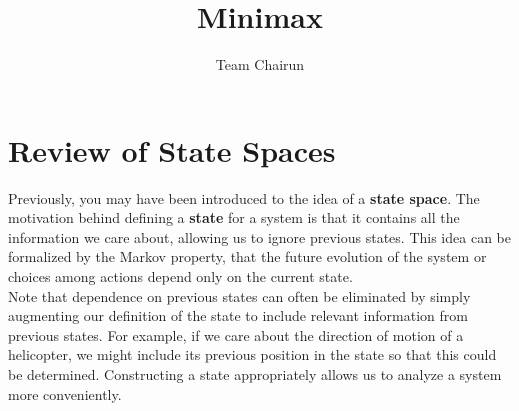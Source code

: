 \documentclass[12pt, letterpaper]{article}
\title{Minimax}
\author{Team Chairun}
\date{}
\begin{document}
\maketitle

\section*{Review of State Spaces}
Previously, you may have been introduced to the idea of a \textbf{state space}. The motivation behind defining a \textbf{state} for a system is that it contains all the information we care about, allowing us to ignore previous states. This idea can be formalized by the Markov property, that the future evolution of the system or choices among actions depend only on the current state. \\[0.2cm]
Note that dependence on previous states can often be eliminated by simply augmenting our definition of the state to include relevant information from previous states. For example, if we care about the direction of motion of a helicopter, we might include its previous position in the state so that this could be determined. Constructing a state appropriately allows us to analyze a system more conveniently.
\end{document}
